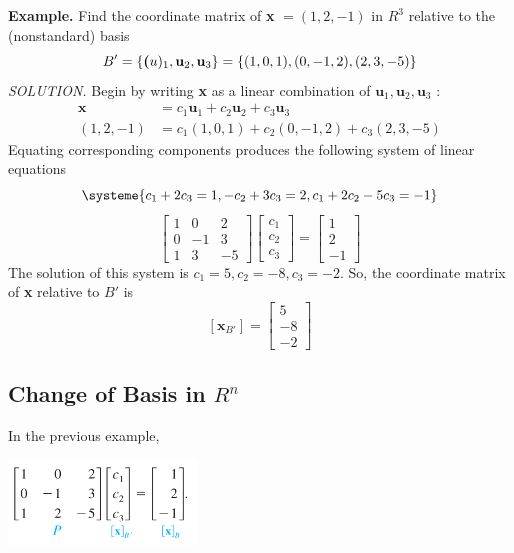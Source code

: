 \documentclass{article}
\newcounter{example}[section]
\newcommand\B{\textbf}
\begin{document}
\begin{tcolorbox}
    \B{Example. } Find the coordinate matrix of \B{x} $= (1, 2, -1)$ in $R^3$ relative to the (nonstandard)
    basis 
    \[ B' = \{ \B(u)_1, \B{u}_2, \B{u}_3 \} = \{ (1,0,1), (0, -1, 2), (2, 3, -5)\} \]
    \textit{SOLUTION. } Begin by writing \B{x} as a linear combination of $\B{u}_1, \B{u}_2, \B{u}_3$ :
    \begin{equation*}
    \begin{split}
        \B{x} & = c_1\B{u}_1 + c_2 \B{u}_2 + c_3\B{u}_3 \\
        (1, 2, -1) & = c_1(1,0,1) + c_2(0,-1,2) + c_3(2,3,-5)
    \end{split}
    \end{equation*}
    Equating corresponding components produces the following system of linear equations
    \[ \systeme {
            c_1 + 2c_3 = 1,
            -c_2 + 3c_3 = 2,
            c_1 + 2c_2 - 5c_3 = -1
        } \]
        \[  \begin{bmatrix}
            1 & 0 & 2 \\ 
            0 & -1 & 3 \\
            1 & 3 & -5
        \end{bmatrix} 
        \begin{bmatrix}
            c_1 \\
            c_2 \\
            c_3
        \end{bmatrix} =
        \begin{bmatrix}
            1 \\
            2 \\
            -1
        \end{bmatrix} \]
    The solution of this system is $c_1 = 5, c_2 = -8, c_3 = -2$. So, the coordinate matrix of \B{x} 
    relative to $B'$ is 
    \[ [\B{x}_{B'}] = \begin{bmatrix}
        5 \\
        -8\\
        -2
    \end{bmatrix} \]

    \subsection{Change of Basis in $R^n$}

    In the previous example, 
    \begin{center}
        \includegraphics[width = 5cm]{images/P3.png}
    \end{center}


\end{tcolorbox}
\end{document}

